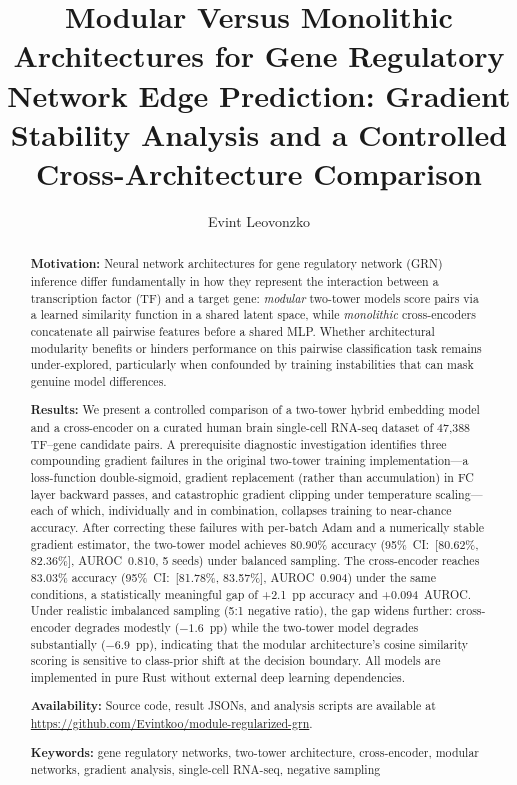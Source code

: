 \documentclass[10pt,twocolumn]{article}
\title{\Large\bfseries Modular Versus Monolithic Architectures for Gene Regulatory
Network Edge Prediction: Gradient Stability Analysis and a Controlled
Cross-Architecture Comparison}
\author{Evint Leovonzko}
\date{}
\begin{document}
\maketitle
\thispagestyle{empty}

\begin{abstract}
\noindent\textbf{Motivation:}
Neural network architectures for gene regulatory network (GRN) inference differ
fundamentally in how they represent the interaction between a transcription
factor (TF) and a target gene: \emph{modular} two-tower models score pairs via
a learned similarity function in a shared latent space, while \emph{monolithic}
cross-encoders concatenate all pairwise features before a shared MLP.
Whether architectural modularity benefits or hinders performance on this
pairwise classification task remains under-explored, particularly when
confounded by training instabilities that can mask genuine model differences.

\noindent\textbf{Results:}
We present a controlled comparison of a two-tower hybrid embedding model and a
cross-encoder on a curated human brain single-cell RNA-seq dataset of 47{,}388
TF--gene candidate pairs.
A prerequisite diagnostic investigation identifies three compounding gradient
failures in the original two-tower training implementation---a loss-function
double-sigmoid, gradient replacement (rather than accumulation) in FC layer
backward passes, and catastrophic gradient clipping under temperature
scaling---each of which, individually and in combination, collapses training to
near-chance accuracy.
After correcting these failures with per-batch Adam and a numerically stable
gradient estimator, the two-tower model achieves 80.90\% accuracy
(95\%~CI:~[80.62\%, 82.36\%], AUROC~0.810, 5 seeds) under balanced sampling.
The cross-encoder reaches 83.03\% accuracy (95\%~CI:~[81.78\%, 83.57\%],
AUROC~0.904) under the same conditions, a statistically meaningful gap of
+2.1~pp accuracy and +0.094~AUROC.
Under realistic imbalanced sampling (5:1 negative ratio), the gap widens
further: cross-encoder degrades modestly ($-1.6$~pp) while the two-tower model
degrades substantially ($-6.9$~pp), indicating that the modular architecture's
cosine similarity scoring is sensitive to class-prior shift at the decision
boundary.
All models are implemented in pure Rust without external deep learning
dependencies.

\noindent\textbf{Availability:}
Source code, result JSONs, and analysis scripts are available at
\url{https://github.com/Evintkoo/module-regularized-grn}.

\noindent\textbf{Keywords:} gene regulatory networks, two-tower architecture,
cross-encoder, modular networks, gradient analysis, single-cell RNA-seq,
negative sampling
\end{abstract}
\end{document}
